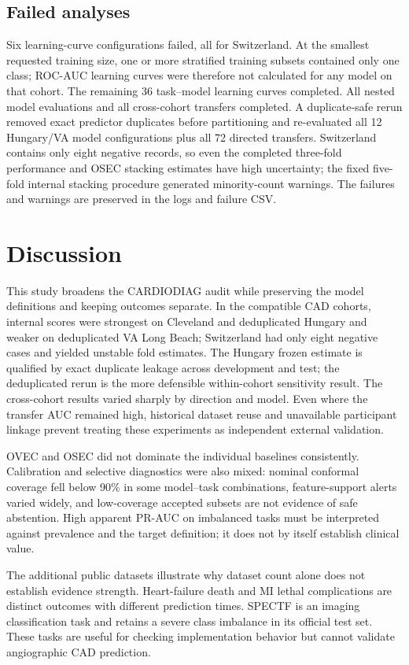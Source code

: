 \documentclass[conference]{IEEEtran}
\begin{document}
\subsection{Failed analyses}
Six learning-curve configurations failed, all for Switzerland. At the smallest requested training size, one or more stratified training subsets contained only one class; ROC-AUC learning curves were therefore not calculated for any model on that cohort. The remaining 36 task--model learning curves completed. All nested model evaluations and all cross-cohort transfers completed. A duplicate-safe rerun removed exact predictor duplicates before partitioning and re-evaluated all 12 Hungary/VA model configurations plus all 72 directed transfers. Switzerland contains only eight negative records, so even the completed three-fold performance and OSEC stacking estimates have high uncertainty; the fixed five-fold internal stacking procedure generated minority-count warnings. The failures and warnings are preserved in the logs and failure CSV.

\section{Discussion}
This study broadens the CARDIODIAG audit while preserving the model definitions and keeping outcomes separate. In the compatible CAD cohorts, internal scores were strongest on Cleveland and deduplicated Hungary and weaker on deduplicated VA Long Beach; Switzerland had only eight negative cases and yielded unstable fold estimates. The Hungary frozen estimate is qualified by exact duplicate leakage across development and test; the deduplicated rerun is the more defensible within-cohort sensitivity result. The cross-cohort results varied sharply by direction and model. Even where the transfer AUC remained high, historical dataset reuse and unavailable participant linkage prevent treating these experiments as independent external validation.

OVEC and OSEC did not dominate the individual baselines consistently. Calibration and selective diagnostics were also mixed: nominal conformal coverage fell below 90\% in some model--task combinations, feature-support alerts varied widely, and low-coverage accepted subsets are not evidence of safe abstention. High apparent PR-AUC on imbalanced tasks must be interpreted against prevalence and the target definition; it does not by itself establish clinical value.

The additional public datasets illustrate why dataset count alone does not establish evidence strength. Heart-failure death and MI lethal complications are distinct outcomes with different prediction times. SPECTF is an imaging classification task and retains a severe class imbalance in its official test set. These tasks are useful for checking implementation behavior but cannot validate angiographic CAD prediction.
\end{document}
